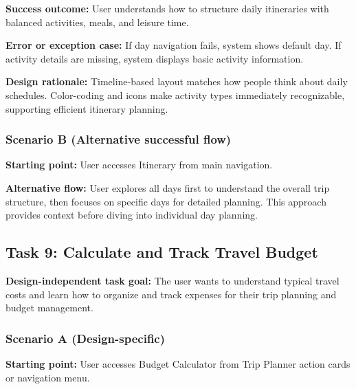 \documentclass[11pt,a4paper]{article}
\begin{document}
\textbf{Success outcome:} User understands how to structure daily itineraries with balanced activities, meals, and leisure time.

\textbf{Error or exception case:} If day navigation fails, system shows default day. If activity details are missing, system displays basic activity information.

\textbf{Design rationale:} Timeline-based layout matches how people think about daily schedules. Color-coding and icons make activity types immediately recognizable, supporting efficient itinerary planning.

\subsubsection*{Scenario B (Alternative successful flow)}

\textbf{Starting point:} User accesses Itinerary from main navigation.

\textbf{Alternative flow:} User explores all days first to understand the overall trip structure, then focuses on specific days for detailed planning. This approach provides context before diving into individual day planning.

\subsection*{Task 9: Calculate and Track Travel Budget}

\textbf{Design-independent task goal:}
The user wants to understand typical travel costs and learn how to organize and track expenses for their trip planning and budget management.

\subsubsection*{Scenario A (Design-specific)}

\textbf{Starting point:} User accesses Budget Calculator from Trip Planner action cards or navigation menu.
\end{document}
